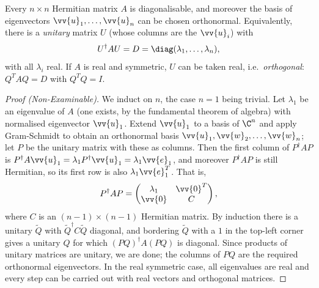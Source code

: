 \begin{theorem}\label{thm:hermitiandiag}
	Every $n \times n$ Hermitian matrix $A$ is diagonalisable, and moreover the basis of eigenvectors $\vv{u}_1, \dots, \vv{u}_n$ can be chosen orthonormal. Equivalently, there is a \emph{unitary} matrix $U$ (whose columns are the $\vv{u}_i$) with
	$$
	U^\dagger A U = D = \diag(\lambda_1, \dots, \lambda_n),
	$$
	with all $\lambda_i$ real. If $A$ is real and symmetric, $U$ can be taken real, i.e.\ \emph{orthogonal}: $Q^T A Q = D$ with $Q^TQ = I$.
\end{theorem}
\begin{proof}[Proof (Non-Examinable)]
	We induct on $n$, the case $n = 1$ being trivial. Let $\lambda_1$ be an eigenvalue of $A$ (one exists, by the fundamental theorem of algebra) with normalised eigenvector $\vv{u}_1$. Extend $\vv{u}_1$ to a basis of $\C^n$ and apply Gram-Schmidt to obtain an orthonormal basis $\vv{u}_1, \vv{w}_2, \dots, \vv{w}_n$; let $P$ be the unitary matrix with these as columns. Then the first column of $P^\dagger A P$ is $P^\dagger A \vv{u}_1 = \lambda_1 P^\dagger \vv{u}_1 = \lambda_1 \vv{e}_1$, and moreover $P^\dagger A P$ is still Hermitian, so its first row is also $\lambda_1 \vv{e}_1^T$. That is,
	$$
	P^\dagger A P = \begin{pmatrix}
		\lambda_1 & \vv{0}^T \\
		\vv{0} & C
	\end{pmatrix},
	$$
	where $C$ is an $(n-1) \times (n-1)$ Hermitian matrix. By induction there is a unitary $\tilde{Q}$ with $\tilde{Q}^\dagger C \tilde{Q}$ diagonal, and bordering $\tilde{Q}$ with a $1$ in the top-left corner gives a unitary $Q$ for which $(PQ)^\dagger A (PQ)$ is diagonal. Since products of unitary matrices are unitary, we are done; the columns of $PQ$ are the required orthonormal eigenvectors. In the real symmetric case, all eigenvalues are real and every step can be carried out with real vectors and orthogonal matrices.
\end{proof}

